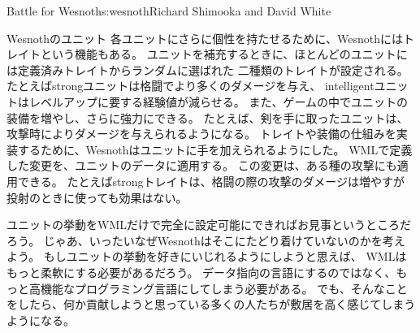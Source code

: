 \begin{aosachapter}{Battle for Wesnoth}{s:wesnoth}{Richard Shimooka and David White}
\begin{aosasect1}{Wesnothのユニット}
各ユニットにさらに個性を持たせるために、Wesnothにはトレイトという機能もある。
ユニットを補充するときに、ほとんどのユニットには定義済みトレイトからランダムに選ばれた
二種類のトレイトが設定される。たとえばstrongユニットは格闘でより多くのダメージを与え、
intelligentユニットはレベルアップに要する経験値が減らせる。
また、ゲームの中でユニットの装備を増やし、さらに強力にできる。
たとえば、剣を手に取ったユニットは、攻撃時によりダメージを与えられるようになる。
トレイトや装備の仕組みを実装するために、Wesnothはユニットに手を加えられるようにした。
WMLで定義した変更を、ユニットのデータに適用する。
この変更は、ある種の攻撃にも適用できる。
たとえばstrongトレイトは、格闘の際の攻撃のダメージは増やすが
投射のときに使っても効果はない。

ユニットの挙動をWMLだけで完全に設定可能にできればお見事というところだろう。
じゃあ、いったいなぜWesnothはそこにたどり着けていないのかを考えよう。
もしユニットの挙動を好きにいじれるようにしようと思えば、
WMLはもっと柔軟にする必要があるだろう。
データ指向の言語にするのではなく、もっと高機能なプログラミング言語にしてしまう必要がある。
でも、そんなことをしたら、何か貢献しようと思っている多くの人たちが敷居を高く感じてしまうようになる。


\end{aosasect1}
\end{aosachapter}
